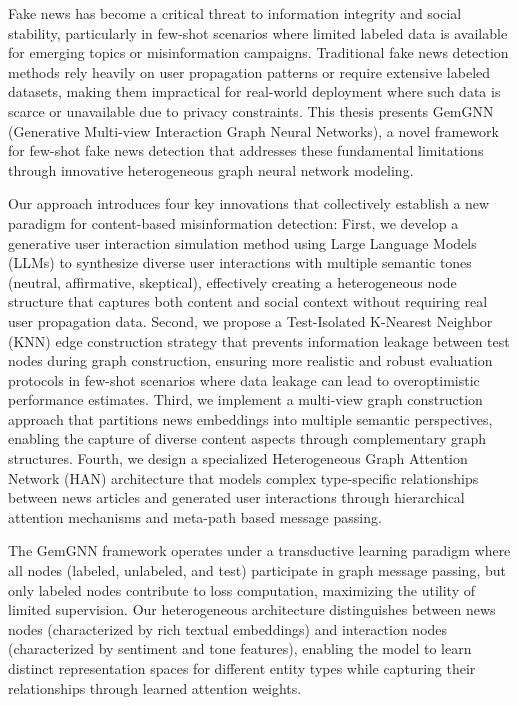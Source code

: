 \StartAbstract

Fake news has become a critical threat to information integrity and social stability, particularly in few-shot scenarios where limited labeled data is available for emerging topics or misinformation campaigns. Traditional fake news detection methods rely heavily on user propagation patterns or require extensive labeled datasets, making them impractical for real-world deployment where such data is scarce or unavailable due to privacy constraints. This thesis presents GemGNN (Generative Multi-view Interaction Graph Neural Networks), a novel framework for few-shot fake news detection that addresses these fundamental limitations through innovative heterogeneous graph neural network modeling.


Our approach introduces four key innovations that collectively establish a new paradigm for content-based misinformation detection: First, we develop a generative user interaction simulation method using Large Language Models (LLMs) to synthesize diverse user interactions with multiple semantic tones (neutral, affirmative, skeptical), effectively creating a heterogeneous node structure that captures both content and social context without requiring real user propagation data. Second, we propose a Test-Isolated K-Nearest Neighbor (KNN) edge construction strategy that prevents information leakage between test nodes during graph construction, ensuring more realistic and robust evaluation protocols in few-shot scenarios where data leakage can lead to overoptimistic performance estimates. Third, we implement a multi-view graph construction approach that partitions news embeddings into multiple semantic perspectives, enabling the capture of diverse content aspects through complementary graph structures. Fourth, we design a specialized Heterogeneous Graph Attention Network (HAN) architecture that models complex type-specific relationships between news articles and generated user interactions through hierarchical attention mechanisms and meta-path based message passing.


The GemGNN framework operates under a transductive learning paradigm where all nodes (labeled, unlabeled, and test) participate in graph message passing, but only labeled nodes contribute to loss computation, maximizing the utility of limited supervision. Our heterogeneous architecture distinguishes between news nodes (characterized by rich textual embeddings) and interaction nodes (characterized by sentiment and tone features), enabling the model to learn distinct representation spaces for different entity types while capturing their relationships through learned attention weights.

